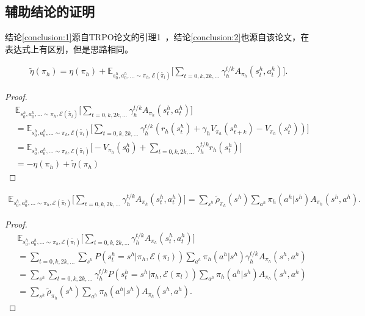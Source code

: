 \subsection{辅助结论的证明}
\label{sec:additional_proof}
结论\ref{conclusion:1}源自TRPO论文的引理1~\cite{TRPO}，结论\ref{conclusion:2}也源自该论文，在表达式上有区别，但是思路相同。
\newtheorem{conclusion}{结论} %

\begin{lemma}
\label{conclusion:1}
\begin{align}
  \tilde{\eta}(\pi_h) = \eta(\pi_h) + \mathbb{E}_{s_0^h, a_0^h, ... \sim \pi_h, \mathcal{E}(\tilde{\pi_l})}\Bigg[\sum_{t=0,k,2k,...} \gamma_h^{t/k} A_{\pi_h}(s_t^h, a_t^h)\Bigg].
\end{align}
\end{lemma}

\begin{proof}
\begin{align}
  &\mathbb{E}_{s_0^h, a_0^h, ... \sim \pi_h, \mathcal{E}(\tilde{\pi_l})}\Bigg[\sum_{t=0,k,2k,...} \gamma_h^{t/k} A_{\pi_h}(s_t^h, a_t^h)\Bigg]\\
  &= \mathbb{E}_{s_0^h, a_0^h, ... \sim \pi_h, \mathcal{E}(\tilde{\pi_l})}\Bigg[
      \sum_{t = 0, k, 2k, ...}\gamma_h^{t/k}(r_h(s_t^h)+\gamma_h V_{\pi_h}(s_{t+k}^h) - V_{\pi_h}(s_t^h))
      \Bigg]\\
  &= \mathbb{E}_{s_0^h, a_0^h, ... \sim \pi_h, \mathcal{E}(\tilde{\pi_l})}\Bigg[
      -V_{\pi_h}(s_0^h) + \sum_{t=0,k,2k,...} \gamma_h^{t/k} r_h(s_t^h)
      \Bigg]\\
  &= -\eta(\pi_h) + \tilde{\eta}(\pi_h)
\end{align}
\end{proof}

\begin{lemma}
\label{conclusion:2}
\begin{align}
    \mathbb{E}_{s_0^h, a_0^h, ... \sim \pi_h, \mathcal{E}(\tilde{\pi_l})}\Bigg[\sum_{t=0,k,2k,...} \gamma_h^{t/k} A_{\pi_h}(s_t^h, a_t^h)\Bigg] = \sum_{s^h}\tilde{\rho}_{\pi_h}(s^h)\sum_{a^h}\pi_h(a^h|s^h)A_{\pi_h}(s^h,a^h).
\end{align}
\end{lemma}

\begin{proof}
\label{proof:lemma2}
\begin{align}
  &\mathbb{E}_{s_0^h, a_0^h, ... \sim \pi_h, \mathcal{E}(\tilde{\pi_l})}\Bigg[\sum_{t=0,k,2k,...} \gamma_h^{t/k} A_{\pi_h}(s_t^h, a_t^h)\Bigg]\\
  &= \sum_{t = 0,k,2k,...} \sum_{s^h} P(s_t^h = s^h| \pi_h, \mathcal{E}(\pi_l)) \sum_{a^h} \pi_h(a^h|s^h) \gamma_h^{t/k} A_{\pi_h}(s^h, a^h)\\
  &= \sum_{s^h} \sum_{t = 0,k,2k,...} \gamma_h^{t/k} P(s_t^h = s^h|\pi_h, \mathcal{E}(\pi_l)) \sum_{a^h}\pi_h(a^h|s^h)A_{\pi_h}(s^h,a^h)\\
  &= \sum_{s^h}\tilde{\rho}_{\pi_h}(s^h)\sum_{a^h}\pi_h(a^h|s^h)A_{\pi_h}(s^h,a^h).
\end{align}
\end{proof}

